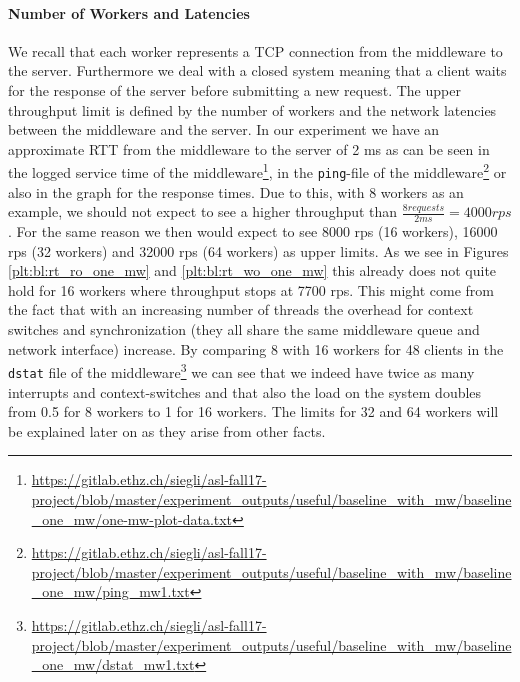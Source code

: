 \documentclass[11pt,a4paper]{article}
\let\tt\texttt
\begin{document}
\paragraph{Number of Workers and Latencies} We recall that each worker represents a TCP connection from the middleware to the server. Furthermore we deal with a closed system meaning that a client waits for the response of the server before submitting a new request. The upper throughput limit is defined by the number of workers and the network latencies between the middleware and the server. In our experiment we have an approximate RTT from the middleware to the server of 2 ms as can be seen in the logged service time of the middleware\footnote{\url{https://gitlab.ethz.ch/siegli/asl-fall17-project/blob/master/experiment_outputs/useful/baseline_with_mw/baseline_one_mw/one-mw-plot-data.txt}}, in the \tt{ping}-file of the middleware\footnote{\url{https://gitlab.ethz.ch/siegli/asl-fall17-project/blob/master/experiment_outputs/useful/baseline_with_mw/baseline_one_mw/ping_mw1.txt}} or also in the graph for the response times. Due to this, with 8 workers as an example, we should not expect to see a higher throughput than $\frac{8 requests}{2ms} = 4000 rps$. For the same reason we then would expect to see 8000 rps (16 workers), 16000 rps (32 workers) and 32000 rps (64 workers) as upper limits. As we see in Figures \ref{plt:bl:rt_ro_one_mw} and \ref{plt:bl:rt_wo_one_mw} this already does not quite hold for 16 workers where throughput stops at 7700 rps. This might come from the fact that with an increasing number of threads the overhead for context switches and synchronization (they all share the same middleware queue and network interface) increase. By comparing 8 with 16 workers for 48 clients in the \tt{dstat} file of the middleware\footnote{\url{https://gitlab.ethz.ch/siegli/asl-fall17-project/blob/master/experiment_outputs/useful/baseline_with_mw/baseline_one_mw/dstat_mw1.txt}} we can see that we indeed have twice as many interrupts and context-switches and that also the load on the system doubles from 0.5 for 8 workers to 1 for 16 workers. The limits for 32 and 64 workers will be explained later on as they arise from other facts. \\
\end{document}
